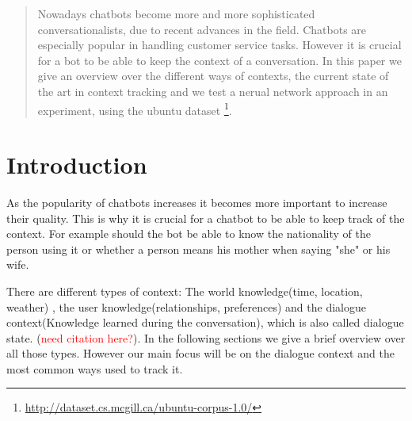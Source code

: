 \documentclass[conference]{IEEEtran}
\newcommand\note[1]{\textcolor{red}{#1}}
\begin{document}
\begin{abstract}
Nowadays chatbots become more and more sophisticated conversationalists, due to recent advances in the field. Chatbots are especially popular in handling customer service tasks. However it is crucial for a bot to be able to keep the context of a conversation.
In this paper we give an overview over the different ways of contexts, the current state of the art in context tracking and we test a nerual network approach in an experiment, using the ubuntu dataset \footnote{\url{http://dataset.cs.mcgill.ca/ubuntu-corpus-1.0/}}.
\end{abstract}





%
\IEEEpeerreviewmaketitle



\section{Introduction}
As the popularity of chatbots increases it becomes more important to increase their quality. This is why it is crucial for a chatbot to be able to keep track of the context. For example should the bot be able to know the nationality of the person using it or whether a person means his mother when saying "she" or his wife. 

There are different types of context: The world knowledge(time, location, weather) , the user knowledge(relationships, preferences) and the dialogue context(Knowledge learned during the conversation), which is also called dialogue state. (\note{need citation here?}). In the following sections we give a brief overview over all those types. However our main focus will be on the dialogue context and the most common ways used to track it. 
\end{document}
